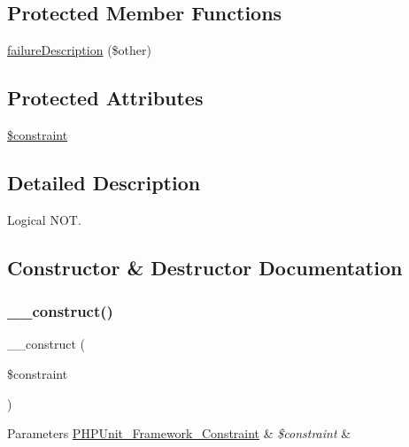\subsection*{Protected Member Functions}
\begin{DoxyCompactItemize}
\item 
\mbox{\hyperlink{class_p_h_p_unit___framework___constraint___not_aaabb679273bfb812df4d81c283754a59}{failure\+Description}} (\$other)
\end{DoxyCompactItemize}
\subsection*{Protected Attributes}
\begin{DoxyCompactItemize}
\item 
\mbox{\hyperlink{class_p_h_p_unit___framework___constraint___not_a50d9f10107fdcde72e77c91a07d654cd}{\$constraint}}
\end{DoxyCompactItemize}


\subsection{Detailed Description}
Logical N\+OT. 

\subsection{Constructor \& Destructor Documentation}
\mbox{\label{class_p_h_p_unit___framework___constraint___not_a6e8cb639ef35c3654e8528d5a5c927e6}} 
\subsubsection{\texorpdfstring{\+\_\+\+\_\+construct()}{\_\_construct()}}
{\footnotesize\ttfamily \+\_\+\+\_\+construct (\begin{DoxyParamCaption}\item[{}]{\$constraint }\end{DoxyParamCaption})}


\begin{DoxyParams}[1]{Parameters}
\mbox{\hyperlink{class_p_h_p_unit___framework___constraint}{P\+H\+P\+Unit\+\_\+\+Framework\+\_\+\+Constraint}} & {\em \$constraint} & \\
\hline
\end{DoxyParams}


